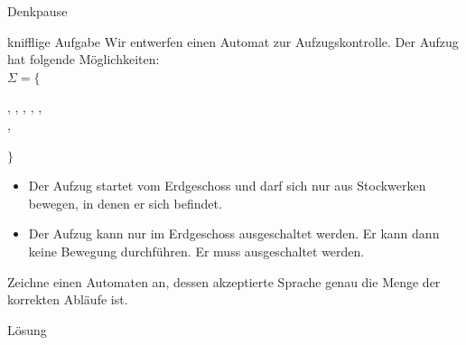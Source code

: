 {
\begin{frame}{Denkpause}
\begin{small}
    \begin{alertblock}{knifflige Aufgabe}
    Wir entwerfen einen Automat zur Aufzugskontrolle.
    Der Aufzug hat folgende Möglichkeiten:\\
    $\Sigma =\{$\begin{footnotesize}
     ,  ,  ,  ,  , \\\qquad\quad\; , 
    \end{footnotesize}$\}$
    \begin{itemize}
        \item Der Aufzug startet vom Erdgeschoss und darf sich nur aus Stockwerken bewegen, in denen er sich befindet.
        \item Der Aufzug kann nur im Erdgeschoss ausgeschaltet werden. Er kann dann keine Bewegung durchführen. Er muss ausgeschaltet werden.
    \end{itemize}
    \end{alertblock}
    \alert{Zeichne einen Automaten an, dessen akzeptierte Sprache genau die Menge der korrekten Abläufe ist.}
    \end{small}
\end{frame}

\begin{frame}{Lösung}
\begin{center}
\end{center}
\end{frame}
}

